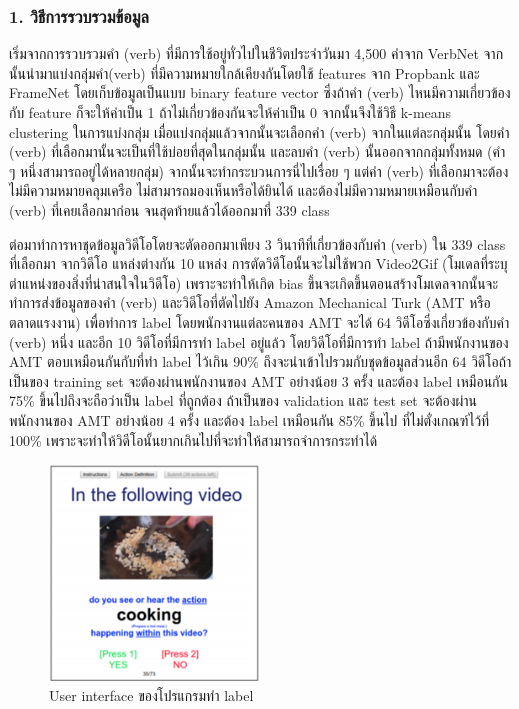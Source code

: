 \subsubsection*{1. วิธีการรวบรวมข้อมูล}
เริ่มจากการรวบรวมคำ (verb) ที่มีการใช้อยู่ทั่วไปในชีวิตประจำวันมา 4,500 คำจาก VerbNet จากนั้นนำมาแบ่งกลุ่มคำ(verb) ที่มีความหมายใกล้เคียงกันโดยใช้ features จาก Propbank และ FrameNet โดยเก็บข้อมูลเป็นแบบ binary feature vector ซึ่งถ้าคำ (verb) ไหนมีความเกี่ยวข้องกับ feature ก็จะให้ค่าเป็น 1 ถ้าไม่เกี่ยวข้องกันจะให้ค่าเป็น 0 จากนั้นจึงใช้วิธี k-means clustering ในการแบ่งกลุ่ม เมื่อแบ่งกลุ่มแล้วจากนั้นจะเลือกคำ (verb) จากในแต่ละกลุ่มนั้น โดยคำ (verb) ที่เลือกมานั้นจะเป็นที่ใช้บ่อยที่สุดในกลุ่มนั้น และลบคำ (verb) นั้นออกจากกลุ่มทั้งหมด (คำ ๆ หนึ่งสามารถอยู่ได้หลายกลุ่ม) จากนั้นจะทำกระบวนการนี่ไปเรื่อย ๆ แต่คำ (verb) ที่เลือกมาจะต้องไม่มีความหมายคลุมเครือ ไม่สามารถมองเห็นหรือได้ยินได้ และต้องไม่มีความหมายเหมือนกับคำ (verb) ที่เคยเลือกมาก่อน จนสุดท้ายแล้วได้ออกมาที่ 339 class
\par
ต่อมาทำการหาชุดข้อมูลวิดีโอโดยจะตัดออกมาเพียง 3 วินาทีที่เกี่ยวข้องกับคำ (verb) ใน 339 class ที่เลือกมา จากวิดีโอ แหล่งต่างกัน 10 แหล่ง การตัดวิดีโอนั้นจะไม่ใช้พวก Video2Gif (โมเดลที่ระบุตำแหน่งของสิ่งที่น่าสนใจในวิดีโอ) เพราะจะทำให้เกิด bias ขึ้นจะเกิดขึ้นตอนสร้างโมเดลจากนั้นจะทำการส่งข้อมูลของคำ (verb) และวิดีโอที่ตัดไปยัง Amazon Mechanical Turk (AMT หรือตลาดแรงงาน) เพื่อทำการ label โดยพนักงานแต่ละคนของ AMT จะได้ 64 วิดีโอซึ่งเกี่ยวข้องกับคำ (verb) หนึ่ง และอีก 10 วิดีโอที่มีการทำ label อยู่แล้ว โดยวิดีโอที่มีการทำ label ถ้ามีพนักงานของ AMT ตอบเหมือนกันกับที่ทำ label ไว้เกิน 90\% ถึงจะนำเข้าไปรวมกับชุดข้อมูลส่วนอีก 64 วิดีโอถ้าเป็นของ training set จะต้องผ่านพนักงานของ AMT อย่างน้อย 3 ครั้ง และต้อง label เหมือนกัน 75\% ขึ้นไปถึงจะถือว่าเป็น label ที่ถูกต้อง ถ้าเป็นของ validation และ test set จะต้องผ่านพนักงานของ AMT อย่างน้อย 4 ครั้ง และต้อง label เหมือนกัน 85\% ขึ้นไป ที่ไม่ตั่งเกณฑ์ไว้ที่ 100\% เพราะจะทำให้วิดีโอนั้นยากเกินไปที่จะทำให้สามารถจำการกระทำได้

\begin{figure}[!ht]
	\centering
	\includegraphics[width=0.5\textwidth]{chapter2/images/UI.png}
		\caption{User interface ของโปรแกรมทำ label}
    	\label{fig:User interface}
\end{figure}

